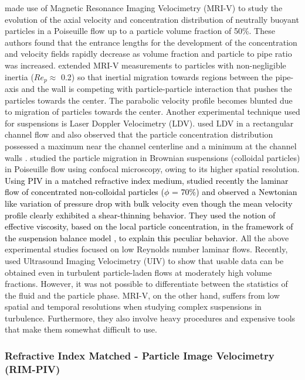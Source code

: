 \documentclass{jfm}
\def\sz#1{{\textcolor{black}{#1}}}
\begin{document}
\cite{hampton1997migration} 
made use of Magnetic Resonance Imaging Velocimetry (MRI-V) to study the evolution of the axial velocity and concentration distribution of neutrally buoyant particles in a Poiseuille flow up to a particle volume fraction of 50\%. These authors found that the entrance lengths for the development of the concentration and velocity fields rapidly decrease as volume fraction and particle to pipe ratio was increased. \citet{han1999particle} extended MRI-V measurements to particles with non-negligible inertia ($Re_{p}\approx$ 0.2) so that inertial migration towards regions between the pipe-axis and the wall is competing with particle-particle interaction that pushes the particles towards the center. The parabolic velocity profile becomes blunted due to migration of particles towards the center. Another experimental technique used for suspensions is Laser Doppler Velocimetry (LDV). \citet{koh1994experimental} used LDV in a rectangular channel flow and also observed that the particle concentration distribution possessed a maximum near the channel centerline and a minimum at the channel walls \cite[see also][]{lyon1998experimental}. \citet{frank2003particle} studied the particle migration in Brownian suspensions (colloidal particles) in Poiseuille flow  using confocal microscopy, owing to its higher spatial resolution. \sz{Using PIV in a matched refractive index medium, \cite{abbas2017pipe} studied recently the laminar flow of concentrated non-colloidal particles ($\phi$ = 70\%) and observed a Newtonian like variation of pressure drop with bulk velocity even though the mean velocity profile clearly exhibited a shear-thinning behavior. They used the notion of effective viscosity, based on the local particle concentration, in the framework of the suspension balance model \citep{zarraga2000characterization}, to explain this peculiar behavior.} All the above experimental studies focused on low Reynolds number laminar flows. Recently, \citet{gurung2016measurement} used Ultrasound Imaging Velocimetry (UIV) to show that usable data can be obtained even in turbulent particle-laden flows at moderately high volume fractions. However, it was not possible to differentiate between the statistics of the fluid and the particle phase. MRI-V, on the other hand, suffers from low spatial and temporal resolutions when studying complex suspensions in turbulence. Furthermore, they also involve heavy procedures and expensive tools that make them somewhat difficult to use.

\subsubsection{Refractive Index Matched - Particle Image Velocimetry (RIM-PIV)}\label{subsec:Simulations of finite-size particles and experiments}
\end{document}
